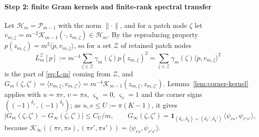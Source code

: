 \documentclass[preprint,12pt,a4paper]{elsarticle}
\theoremstyle{remark}
\begin{document}
\paragraph{Step 2: finite Gram kernels and finite-rank spectral transfer}
Let $\mathcal H_m=\mathcal P_{m-1}$ with the norm $\|\cdot\|$, and for a patch node
$\zeta$ let $v_{m,\zeta}=m^{-2}\mathcal K_{m-1}(\cdot,z_{m,\zeta})\in\mathcal H_m$.
By the reproducing property $p(z_{m,\zeta})=m^2\langle p,v_{m,\zeta}\rangle$, so
for a set $\mathcal Z$ of retained patch nodes
\[
 L^{\mathcal Z}_m[p]:=m^{-4}\sum_{\zeta\in\mathcal Z}\gamma_m(\zeta)p(z_{m,\zeta})^2
 =\sum_{\zeta\in\mathcal Z}\gamma_m(\zeta)\langle p,v_{m,\zeta}\rangle^2
\]
is the part of \eqref{eq:L-m} coming from $\mathcal Z$, and
$G_m(\zeta,\zeta')=\langle v_{m,\zeta},v_{m,\zeta'}\rangle=m^{-4}\mathcal K_{m-1}(z_{m,\zeta},z_{m,\zeta'})$.
Lemma~\ref{lem:corner-kernel} applies with $u=\pi r$, $v=\pi s$, $\varsigma_u=0$,
$\varsigma_v=1$ and the corner signs $((-1)^{\delta_x},(-1)^{\delta_y})$; as
$u,v\le U:=\pi(K-1)$, it gives
\begin{equation}\label{eq:gram-diff}
 |G_m(\zeta,\zeta')-G_\infty(\zeta,\zeta')|\le C_U/m,\qquad
 G_\infty(\zeta,\zeta')=\boldsymbol1_{(\delta_x,\delta_y)=(\delta_x',\delta_y')}\,
 \langle\psi_{rs},\psi_{r's'}\rangle ,
\end{equation}
because $\mathcal K_\infty((\pi r,\pi s),(\pi r',\pi s'))=\langle\psi_{rs},\psi_{r's'}\rangle$.
\end{document}
